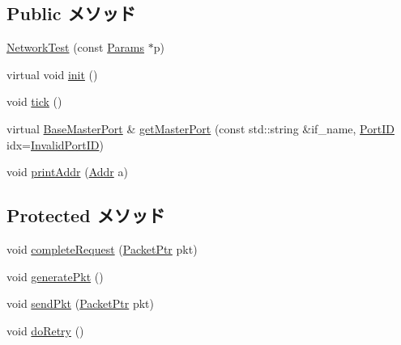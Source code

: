 \subsection*{Public メソッド}
\begin{DoxyCompactItemize}
\item 
\hyperlink{classNetworkTest_af5fa4fd17ce192cb0bd275383a22b832}{NetworkTest} (const \hyperlink{classNetworkTest_aa26fd7704e843bb985048632459a664e}{Params} $\ast$p)
\item 
virtual void \hyperlink{classNetworkTest_a02fd73d861ef2e4aabb38c0c9ff82947}{init} ()
\item 
void \hyperlink{classNetworkTest_a873dd91783f9efb4a590aded1f70d6b0}{tick} ()
\item 
virtual \hyperlink{classBaseMasterPort}{BaseMasterPort} \& \hyperlink{classNetworkTest_adc4e675e51defbdd1e354dac729d0703}{getMasterPort} (const std::string \&if\_\-name, \hyperlink{base_2types_8hh_acef4d7d41cb21fdc252e20c04cd7bb8e}{PortID} idx=\hyperlink{base_2types_8hh_a65bf40f138cf863f0c5e2d8ca1144126}{InvalidPortID})
\item 
void \hyperlink{classNetworkTest_a88aa41e2693dd0091afae2604eba9bed}{printAddr} (\hyperlink{base_2types_8hh_af1bb03d6a4ee096394a6749f0a169232}{Addr} a)
\end{DoxyCompactItemize}
\subsection*{Protected メソッド}
\begin{DoxyCompactItemize}
\item 
void \hyperlink{classNetworkTest_afad8eceee562939262183ad20f806b82}{completeRequest} (\hyperlink{classPacket}{PacketPtr} pkt)
\item 
void \hyperlink{classNetworkTest_af3b3ac4f2b4a4cf1ee74748126a70641}{generatePkt} ()
\item 
void \hyperlink{classNetworkTest_afd43ca83ca8c1d5fde8a2f349aa2cdc0}{sendPkt} (\hyperlink{classPacket}{PacketPtr} pkt)
\item 
void \hyperlink{classNetworkTest_a31440e5510a8c7bfc74e17363d813401}{doRetry} ()
\end{DoxyCompactItemize}
